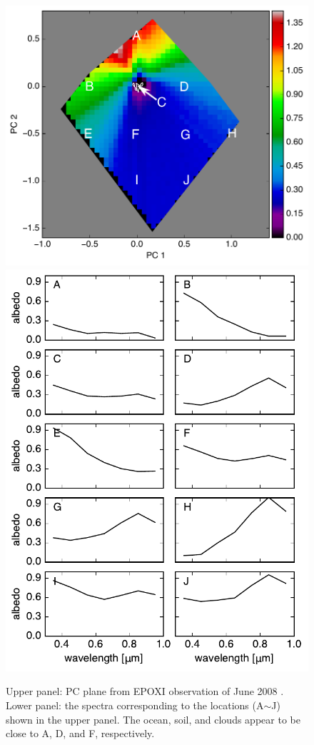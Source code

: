 \documentclass[iop,numberedappendix,apj,]{emulateapj}
\begin{document}
\begin{figure}[tbh!]
    \begin{center}
	\includegraphics[width=\hsize]{raddata_2_PCplane_noreg_labels.pdf}
	\includegraphics[width=\hsize]{raddata_2_norm_spectra.pdf}
    \end{center}
    \caption{Upper panel: PC plane from EPOXI observation of June 2008 \citep{Livengood2011}. Lower panel: the spectra corresponding to the locations (A$\sim$J) shown in the upper panel. The ocean, soil, and clouds appear to be close to A, D, and F, respectively. }
\label{fig:EPOXI}
\end{figure}
\end{document}
